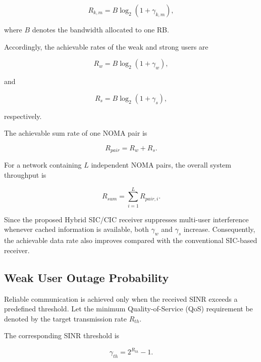 \documentclass[conference]{IEEEtran}
\begin{document}
\begin{equation}
R_{k,m}
=
B
\log_2
\left(
1+\gamma_{k,m}
\right),
\end{equation}

where $B$ denotes the bandwidth allocated to one RB.

Accordingly, the achievable rates of the weak and strong users are

\begin{equation}
R_w
=
B
\log_2
(1+\gamma_w),
\end{equation}

and

\begin{equation}
R_s
=
B
\log_2
(1+\gamma_s),
\end{equation}

respectively.

The achievable sum rate of one NOMA pair is

\begin{equation}
R_{pair}
=
R_w+R_s.
\end{equation}

For a network containing $L$ independent NOMA pairs, the overall system throughput is

\begin{equation}
R_{sum}
=
\sum_{i=1}^{L}
R_{pair,i}.
\end{equation}

Since the proposed Hybrid SIC/CIC receiver suppresses multi-user interference whenever cached information is available, both $\gamma_w$ and $\gamma_s$ increase. Consequently, the achievable data rate also improves compared with the conventional SIC-based receiver.

\subsection{Weak User Outage Probability}

Reliable communication is achieved only when the received SINR exceeds a predefined threshold. Let the minimum Quality-of-Service (QoS) requirement be denoted by the target transmission rate $R_{th}$.

The corresponding SINR threshold is

\begin{equation}
\gamma_{th}
=
2^{R_{th}}-1.
\end{equation}
\end{document}
